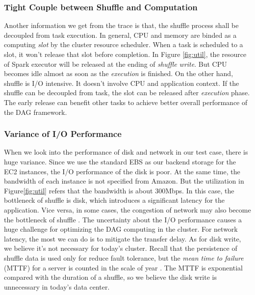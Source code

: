 \subsubsection{Tight Couple between Shuffle and Computation}
Another information we get from the trace is that, the shuffle process shall be decoupled from task execution. In general, CPU and memory are binded as a computing \textit{slot} by the cluster resource scheduler. When a task is scheduled to a slot, it won't release that slot before completion. In Figure \ref{fig:util}, the resource of Spark executor will be released at the ending of \textit{shuffle write}.
But CPU becomes idle almost as soon as the \textit{execution} is finished. On the other hand, shuffle is I/O intensive. It doesn't involve CPU and application context. If the shuffle can be decoupled from task, the slot can be released after \textit{execution} phase. The early release can benefit other tasks to achieve better overall performance of the DAG framework.

\subsubsection{Variance of I/O Performance}
When we look into the performance of disk and network in our test case, there is huge variance. Since we use the standard EBS as our backend storage for the EC2 instances, the I/O performance of the disk is poor. 
At the same time, the bandwidth of each instance is not specified from Amazon. But the utilization in Figure\ref{fig:util} refers that the bandwidth is about $300$Mbps. In this case, the bottleneck of shuffle is disk, which introduces a significant latency for the application. Vice versa, in some cases, the congestion of network may also become the bottleneck of shuffle \cite{varys}. The uncertainty about the I/O performance causes a huge challenge for optimizing the DAG computing in the cluster. For network latency, the most we can do is to mitigate the transfer delay. As for disk write, we believe it's not necessary for today's cluster. Recall that the persistence of shuffle data is used only for reduce fault tolerance, but the \textit{mean time to failure} (MTTF) for a server is counted in the scale of year \cite{tachyon}. The MTTF is exponential compared with the duration of a shuffle, so we believe the disk write is unnecessary in today's data center. 

